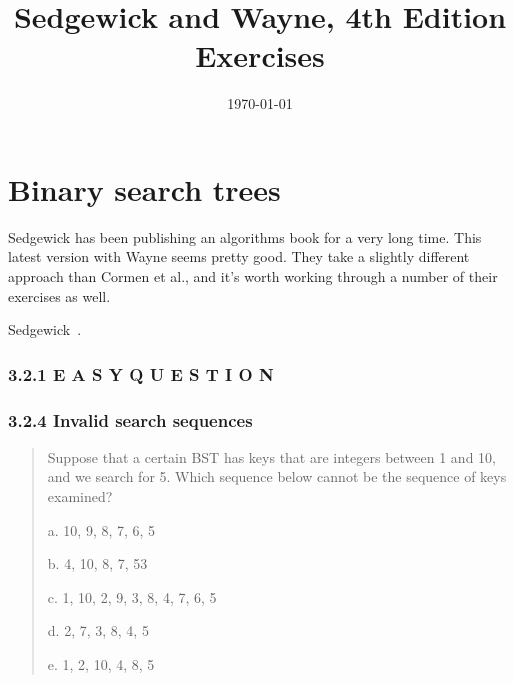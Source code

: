 \documentclass{article}
\title{Sedgewick and Wayne, 4th Edition Exercises}
\date{\today}
\begin{document}
\maketitle

\section{Binary search trees}

Sedgewick has been publishing an algorithms book for a very long time.
This latest version with Wayne seems pretty good. They take a slightly
different approach than Cormen et al., and it's worth working through
a number of their exercises as well.

Sedgewick~\cite{sedgewick:r1990}.


\subsubsection{3.2.1 E A S Y Q U E S T I O N}



\subsubsection{3.2.4 Invalid search sequences}

\begin{quote}
Suppose that a certain BST has keys that are integers between 1 and 10, and we
search for 5. Which sequence below cannot be the sequence of keys examined?

a. 10, 9, 8, 7, 6, 5

b. 4, 10, 8, 7, 53

c. 1, 10, 2, 9, 3, 8, 4, 7, 6, 5

d. 2, 7, 3, 8, 4, 5

e. 1, 2, 10, 4, 8, 5
\end{quote}

{}

\end{document}
